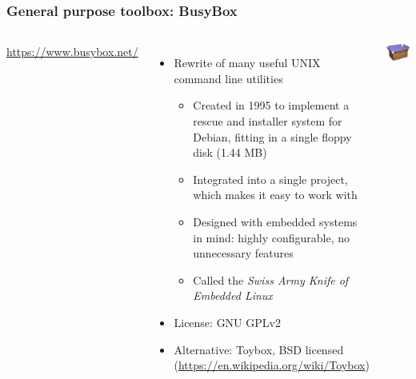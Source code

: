 \begin{frame}
  \frametitle{General purpose toolbox: BusyBox}
  \begin{columns}
      \url{https://www.busybox.net/}
      \begin{itemize}
      \item Rewrite of many useful UNIX command line utilities
        \begin{itemize}
        \item Created in 1995 to implement a rescue and installer
         system for Debian, fitting in a single floppy disk (1.44 MB)
        \item Integrated into a single project, which makes it easy to
          work with
        \item Designed with embedded systems in mind: highly configurable,
          no unnecessary features
        \item Called the {\em Swiss Army Knife of Embedded Linux}
        \end{itemize}
      \item License: GNU GPLv2
      \item Alternative: Toybox, BSD licensed (\url{https://en.wikipedia.org/wiki/Toybox})
      \end{itemize}
    \includegraphics[width=\textwidth]{common/busybox.png}
  \end{columns}
\end{frame}

